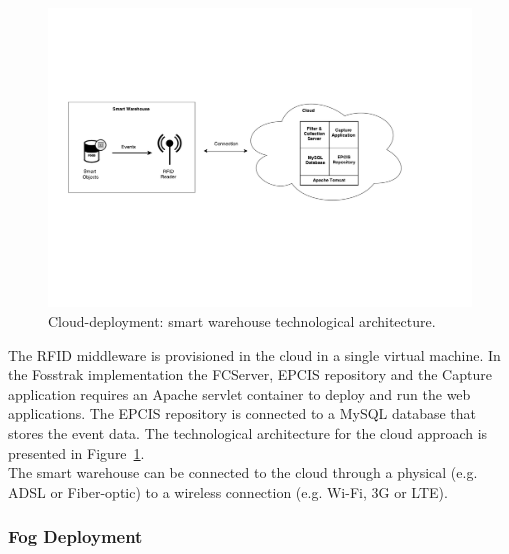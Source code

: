\begin{figure}
\centering
\includegraphics[width=\textwidth]{./images/implementation_cloud_architecture}
\caption[Cloud-deployment: technological architecture.]{Cloud-deployment: smart warehouse technological architecture.}
\label{fig:implementation_cloud_architecture}
\end{figure}

The \gls{RFID} middleware is provisioned in the cloud in a single virtual machine. In the
Fosstrak implementation the \gls{FCServer}, \gls{EPCIS} repository and the Capture application
requires an Apache servlet container to deploy and run the web applications. The \gls{EPCIS}
repository is connected to a MySQL database that stores the event data. The technological architecture
for the cloud approach is presented in Figure~\ref{fig:implementation_cloud_architecture}.\\

The smart warehouse can be connected to the cloud through a physical (e.g. \gls{ADSL} or Fiber-optic)
to a wireless connection (e.g. Wi-Fi, 3G or \gls{LTE}).

\subsubsection{Fog Deployment}
\label{subs:imp_smart_warehouse_fog}

